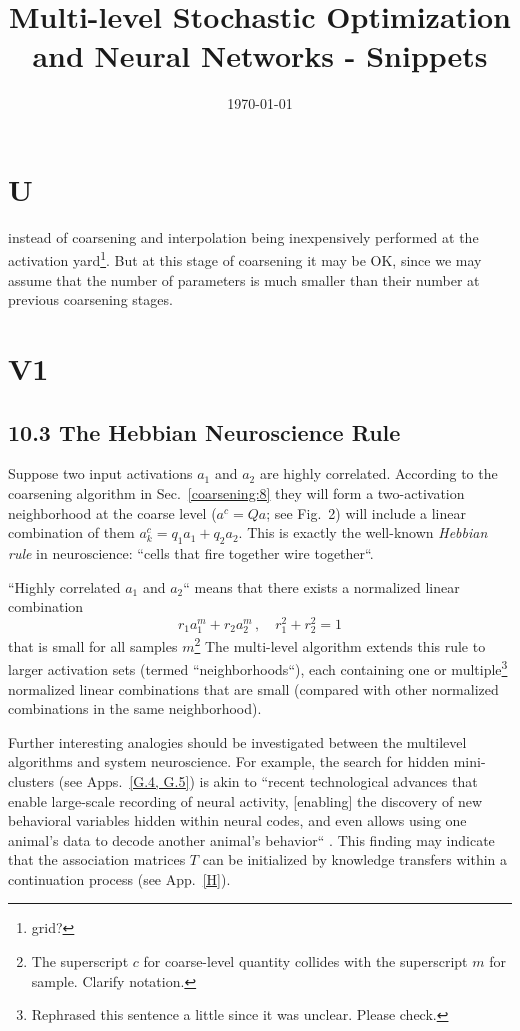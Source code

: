\documentclass{article} %
\title{Multi-level Stochastic Optimization and Neural Networks - Snippets}
\date{\today}
\begin{document}



\newpage
\section{U}
instead of coarsening and interpolation being inexpensively performed at the activation yard\footnote{grid?}. But at this stage of coarsening it may be OK, since we may assume that the number of parameters is much smaller than their number at previous coarsening stages.

\section{V1}
\subsection{10.3 The Hebbian Neuroscience Rule}
Suppose two input activations $a_1$ and $a_2$ are highly correlated. According to the coarsening algorithm in Sec.~\ref{coarsening:8} they will form a two-activation neighborhood at the coarse level ($a^c = Q a$; see Fig.~{2}) will include a linear combination of them $a^c_k = q_1 a_1 + q_2 a_2$. This is exactly the well-known {\it Hebbian rule} in neuroscience: ``cells that fire together wire together``.

``Highly correlated $a_1$ and $a_2$`` means that there exists a normalized linear combination
$$ r_1 a^m_1 + r_2 a^m_2\,, \quad r_1^2 + r_2^2 = 1 $$
that is small for all samples $m$\footnote{The superscript $c$ for coarse-level quantity collides with the superscript $m$ for sample. Clarify notation.} The multi-level algorithm extends this rule to larger activation sets (termed ``neighborhoods``), each containing one or multiple\footnote{Rephrased this sentence a little since it was unclear. Please check.} normalized linear combinations that are small (compared with other normalized combinations in the same neighborhood).

Further interesting analogies should be investigated between the multilevel algorithms and system neuroscience. For example, the search for hidden mini-clusters (see Apps.~\ref{G.4, G.5}) is akin to ``recent technological advances that enable large-scale recording of neural activity, [enabling] the discovery of new behavioral variables hidden within neural codes, and even allows using one animal's data to decode another animal's behavior`` \cite{18}. This finding may indicate that the association matrices $T$ can be initialized by knowledge transfers within a continuation process (see App.~\ref{H}).
\end{document}
